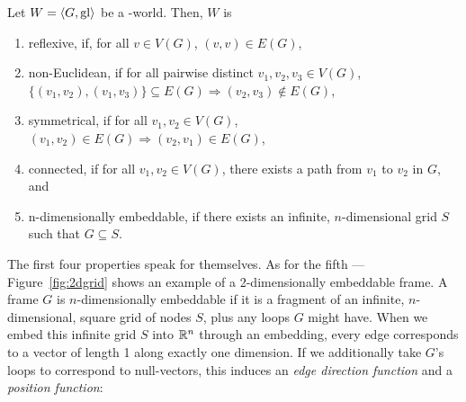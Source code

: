 \begin{definition}
	Let $W = \langle G,\mathrm{gl} \rangle$ be a \wext-world. Then, $W$ is
	\begin{enumerate}
		\item {\upshape reflexive}, if, for all $v \in V(G)$, $(v,v) \in E(G)$,
		\item {\upshape non-Euclidean}, if for all pairwise distinct $v_1,v_2,v_3 \in V(G)$, $\{(v_1,v_2),(v_1,v_3)\} \subseteq E(G) \Rightarrow (v_2,v_3) \notin E(G)$,
		\item {\upshape symmetrical}, if for all $v_1,v_2 \in V(G)$, $(v_1,v_2) \in E(G) \Rightarrow (v_2,v_1) \in E(G)$,
		\item {\upshape connected}, if for all $v_1,v_2 \in V(G)$, there exists a path from $v_1$ to $v_2$ in $G$, and
		\item {\upshape n-dimensionally embeddable}, if there exists an infinite, $n$-dimensional grid $S$ such that $G \subseteq S$.%
	\end{enumerate}
\end{definition}

The first four properties speak for themselves. As for the fifth --- Figure~\ref{fig:2dgrid} shows an example of a 2-dimensionally embeddable frame. A frame $G$ is $n$-dimensionally embeddable if it is a fragment of an infinite, $n$-dimensional, square grid of nodes $S$, plus any loops $G$ might have. When we embed this infinite grid $S$ into $\mathbb{R}^n$ through an embedding, every edge corresponds to a vector of length 1 along exactly one dimension. If we additionally take $G$'s loops to correspond to null-vectors, this induces an {\em edge direction function} and a {\em position function}:


